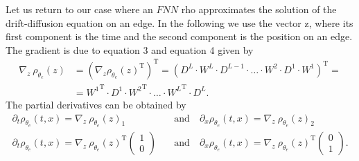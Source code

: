 Let us return to our case where an $FNN$ rho approximates the solution of the drift-diffusion equation on an edge. In the following we use the vector z, where its first component is the time and the second component is the position on an edge. The gradient is due to equation 3 and equation 4 given by 
\begin{equation}
    \begin{split}
        \nabla_{z}  \ \rho_{\theta_e}\left(z\right) & = \left(\nabla_{z} \rho_{\theta_e}\left(z\right)^{\mathrm{T}} \right)^{\mathrm{T}} = \left(D^L \cdot W^L \cdot D^{L-1} \cdot \ldots \cdot W^2 \cdot D^1 \cdot W^{1} \right)^{\mathrm{T}} = \\
        & = {W^{1}}^{\mathrm{T}} \cdot D^{1} \cdot {W^{2}}^{\mathrm{T}} \cdot \ldots \cdot {W^{L}}^{\mathrm{T}}  \cdot  D^{L}. 
    \end{split}
\end{equation}
The partial derivatives can be obtained by 
\begin{equation*}
    \begin{split}
        \partial_t \rho_{\theta_e}\left(t,x\right) = \nabla_{z} \ \rho_{\theta_e}\left(z\right)_1 \quad & \text{and} \quad \partial_x \rho_{\theta_e}\left(t,x\right) = \nabla_{z} \ \rho_{\theta_e}\left(z\right)_2 \\
        \partial_t \rho_{\theta_e}\left(t,x\right) = {\nabla_{z} \ \rho_{\theta_e}\left(z\right)}^{\mathrm{T}} \begin{pmatrix} 1 \\ 0 \end{pmatrix} \quad & \text{and} \quad \partial_x \rho_{\theta_e}\left(t,x\right) = {\nabla_{z} \ \rho_{\theta_e}\left(z\right)}^{\mathrm{T}} \begin{pmatrix} 0 \\ 1 \end{pmatrix}.
    \end{split}
\end{equation*}







